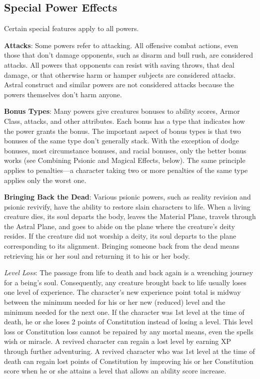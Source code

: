 \subsection{Special Power Effects}
Certain special features apply to all powers.

\textbf{Attacks}: Some powers refer to attacking. All offensive combat actions, even those that don't damage opponents, such as disarm and bull rush, are considered attacks. All powers that opponents can resist with saving throws, that deal damage, or that otherwise harm or hamper subjects are considered attacks. Astral construct and similar powers are not considered attacks because the powers themselves don't harm anyone.

\textbf{Bonus Types}: Many powers give creatures bonuses to ability scores, Armor Class, attacks, and other attributes. Each bonus has a type that indicates how the power grants the bonus. The important aspect of bonus types is that two bonuses of the same type don't generally stack. With the exception of dodge bonuses, most circumstance bonuses, and racial bonuses, only the better bonus works (see Combining Psionic and Magical Effects, below). The same principle applies to penalties---a character taking two or more penalties of the same type applies only the worst one.

\textbf{Bringing Back the Dead}: Various psionic powers, such as reality revision and psionic revivify, have the ability to restore slain characters to life. When a living creature dies, its soul departs the body, leaves the Material Plane, travels through the Astral Plane, and goes to abide on the plane where the creature's deity resides. If the creature did not worship a deity, its soul departs to the plane corresponding to its alignment. Bringing someone back from the dead means retrieving his or her soul and returning it to his or her body.

\textit{Level Loss}: The passage from life to death and back again is a wrenching journey for a being's soul. Consequently, any creature brought back to life usually loses one level of experience. The character's new experience point total is midway between the minimum needed for his or her new (reduced) level and the minimum needed for the next one. If the character was 1st level at the time of death, he or she loses 2 points of Constitution instead of losing a level. This level loss or Constitution loss cannot be repaired by any mortal means, even the spells wish or miracle. A revived character can regain a lost level by earning XP through further adventuring. A revived character who was 1st level at the time of death can regain lost points of Constitution by improving his or her Constitution score when he or she attains a level that allows an ability score increase.

